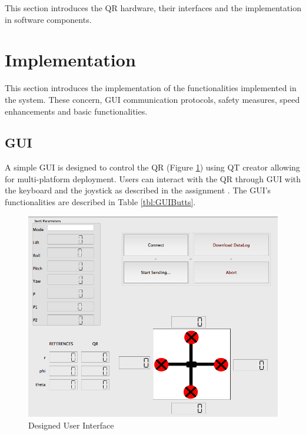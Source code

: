 \documentclass{article}
\begin{document}
This section introduces the QR hardware, their interfaces and the implementation in software components. 



\section{Implementation}
\label{sec:implementation}

This section introduces the implementation of the functionalities implemented in the system. These concern, GUI communication protocols, safety measures, speed enhancements and basic functionalities.


\subsection{GUI}
A simple GUI is designed to control the QR (Figure \ref{fig.GUI}) using QT creator allowing for multi-platform deployment. Users can interact with the QR through GUI with the keyboard and the joystick as described in the assignment \cite{langendoen2014assignment}. The GUI's functionalities are described in Table \ref{tbl:GUIButts}. 

\begin{figure}[ht]
\centering
	\includegraphics[scale=0.4]{Figures/GUI.png}
	\caption{Designed User Interface}
	\label{fig.GUI}
\end{figure}
\end{document}
